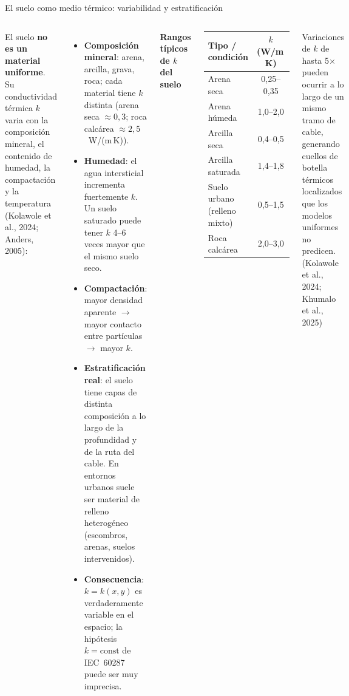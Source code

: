 \documentclass[aspectratio=169]{beamer}
\newcommand{\refcite}[1]{{\footnotesize\color{gray!70!black} #1}}
\begin{document}
\begin{frame}{El suelo como medio térmico: variabilidad y estratificación}
\begin{columns}[T]
\justifying\small
El suelo \textbf{no es un material uniforme}. Su conductividad térmica $k$
varia con la composición mineral, el contenido de humedad, la compactación
y la temperatura \refcite{(Kolawole et al., 2024; Anders, 2005)}:
\begin{itemize}[leftmargin=*]\scriptsize
    \item \textbf{Composición mineral}: arena, arcilla, grava, roca; cada
          material tiene $k$ distinta (arena seca $\approx0{,}3$; roca
          calcárea $\approx2{,}5$~W/(m\,K)).
    \item \textbf{Humedad}: el agua intersticial incrementa fuertemente $k$.
          Un suelo saturado puede tener $k$ 4--6 veces mayor que el mismo
          suelo seco.
    \item \textbf{Compactación}: mayor densidad aparente $\to$ mayor contacto
          entre partículas $\to$ mayor $k$.
    \item \textbf{Estratificación real}: el suelo tiene capas de distinta
          composición a lo largo de la profundidad y de la ruta del cable.
          En entornos urbanos suele ser material de relleno heterogéneo
          (escombros, arenas, suelos intervenidos).
    \item \textbf{Consecuencia}: $k=k(x,y)$ es verdaderamente variable en
          el espacio; la hipótesis $k=\text{const}$ de IEC~60287 puede ser
          muy imprecisa.
\end{itemize}

\small\textbf{Rangos típicos de $k$ del suelo}
\vspace{0.15em}
\begin{center}\scriptsize
\begin{tabular}{lc}
\toprule
\textbf{Tipo / condición}         & \textbf{$k$ (W/m\,K)} \\
\midrule
Arena seca                         & 0{,}25--0{,}35 \\
Arena húmeda                       & 1{,}0--2{,}0 \\
Arcilla seca                       & 0{,}4--0{,}5 \\
Arcilla saturada                   & 1{,}4--1{,}8 \\
Suelo urbano (relleno mixto)       & 0{,}5--1{,}5 \\
Roca calcárea                      & 2{,}0--3{,}0 \\
\bottomrule
\end{tabular}
\end{center}
\vspace{0.2em}
\begin{alertblock}{}\scriptsize
Variaciones de $k$ de hasta 5$\times$ pueden ocurrir a lo largo de
un mismo tramo de cable, generando cuellos de botella térmicos
localizados que los modelos uniformes no predicen.
\refcite{(Kolawole et al., 2024; Khumalo et al., 2025)}
\end{alertblock}
\end{columns}
\end{frame}
\end{document}
